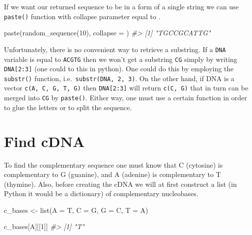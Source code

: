 \documentclass[
]{book}
\newenvironment{Shaded}{\begin{snugshade}}{\end{snugshade}}
\newcommand{\AttributeTok}[1]{\textcolor[rgb]{0.77,0.63,0.00}{#1}}
\newcommand{\CommentTok}[1]{\textcolor[rgb]{0.56,0.35,0.01}{\textit{#1}}}
\newcommand{\DecValTok}[1]{\textcolor[rgb]{0.00,0.00,0.81}{#1}}
\newcommand{\FunctionTok}[1]{\textcolor[rgb]{0.00,0.00,0.00}{#1}}
\newcommand{\NormalTok}[1]{#1}
\newcommand{\OtherTok}[1]{\textcolor[rgb]{0.56,0.35,0.01}{#1}}
\newcommand{\StringTok}[1]{\textcolor[rgb]{0.31,0.60,0.02}{#1}}
\begin{document}
If we want our returned sequence to be in a form of a single string we can use \texttt{paste()} function with collapse parameter equal to \texttt{\textquotesingle{}\textquotesingle{}}.

\begin{Shaded}
\begin{Highlighting}[]
\FunctionTok{paste}\NormalTok{(}\FunctionTok{random\_sequence}\NormalTok{(}\DecValTok{10}\NormalTok{), }\AttributeTok{collapse =} \StringTok{\textquotesingle{}\textquotesingle{}}\NormalTok{)}
\CommentTok{\#\textgreater{} [1] "TGCCGCATTG"}
\end{Highlighting}
\end{Shaded}

Unfortunately, there is no convenient way to retrieve a substring. If a \texttt{DNA} variable is equal to \texttt{\textquotesingle{}ACGTG\textquotesingle{}} then we won't get a substring \texttt{\textquotesingle{}CG\textquotesingle{}} simply by writing \texttt{DNA{[}2:3{]}} (one could to this in python). One could do this by employing the \texttt{substr()} function, i.e.~\texttt{substr(DNA,\ 2,\ 3)}. On the other hand, if DNA is a vector \texttt{c(\textquotesingle{}A\textquotesingle{},\ \textquotesingle{}C\textquotesingle{},\ \textquotesingle{}G\textquotesingle{},\ \textquotesingle{}T\textquotesingle{},\ \textquotesingle{}G\textquotesingle{})} then \texttt{DNA{[}2:3{]}} will return \texttt{c(\textquotesingle{}C\textquotesingle{},\ \textquotesingle{}G\textquotesingle{})} that in turn can be merged into \texttt{\textquotesingle{}CG\textquotesingle{}} by \texttt{paste()}. Either way, one must use a certain function in order to glue the letters or to split the sequence.

\hypertarget{find-cdna}{%
\section{Find cDNA}\label{find-cdna}}

To find the complementary sequence one must know that C (cytosine) is complementary to G (guanine), and A (adenine) is complementary to T (thymine). Also, before creating the cDNA we will at first construct a list (in Python it would be a dictionary) of complementary nucleobases.

\begin{Shaded}
\begin{Highlighting}[]
\NormalTok{c\_bases }\OtherTok{\textless{}{-}} \FunctionTok{list}\NormalTok{(}\StringTok{\textquotesingle{}A\textquotesingle{}} \OtherTok{=} \StringTok{\textquotesingle{}T\textquotesingle{}}\NormalTok{, }\StringTok{\textquotesingle{}C\textquotesingle{}} \OtherTok{=} \StringTok{\textquotesingle{}G\textquotesingle{}}\NormalTok{, }\StringTok{\textquotesingle{}G\textquotesingle{}} \OtherTok{=} \StringTok{\textquotesingle{}C\textquotesingle{}}\NormalTok{, }\StringTok{\textquotesingle{}T\textquotesingle{}} \OtherTok{=} \StringTok{\textquotesingle{}A\textquotesingle{}}\NormalTok{)}

\NormalTok{c\_bases[}\StringTok{\textquotesingle{}A\textquotesingle{}}\NormalTok{][[}\DecValTok{1}\NormalTok{]]}
\CommentTok{\#\textgreater{} [1] "T"}
\end{Highlighting}
\end{Shaded}
\end{document}
